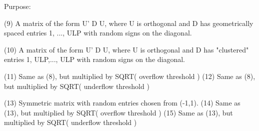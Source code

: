 \begin{DoxyParagraph}{Purpose\+: }
\begin{DoxyVerb}
 (9)  A matrix of the form  U' D U, where U is orthogonal and
      D has geometrically spaced entries 1, ..., ULP with random
      signs on the diagonal.

 (10) A matrix of the form  U' D U, where U is orthogonal and
      D has "clustered" entries 1, ULP,..., ULP with random
      signs on the diagonal.

 (11) Same as (8), but multiplied by SQRT( overflow threshold )
 (12) Same as (8), but multiplied by SQRT( underflow threshold )

 (13) Symmetric matrix with random entries chosen from (-1,1).
 (14) Same as (13), but multiplied by SQRT( overflow threshold )
 (15) Same as (13), but multiplied by SQRT( underflow threshold )\end{DoxyVerb}
 
\end{DoxyParagraph}

